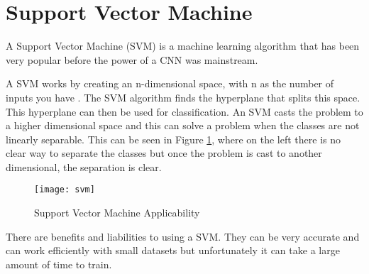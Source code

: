 \section{Support Vector Machine}
A Support Vector Machine (SVM) is a machine learning algorithm that has been
very popular before the power of a CNN was mainstream.

A SVM works by creating an n-dimensional space, with n as the number of
inputs you have \textcite{svm}. The SVM algorithm finds the hyperplane that splits this space.
This hyperplane can then be used for classification. 
An SVM casts the problem to a higher dimensional space and this can solve a problem when the classes are not linearly separable.
This can be seen in Figure \ref{fig:svm}, where on the left there is no clear way to separate the classes but once the problem is cast to another dimensional, the separation is clear.

\begin{figure}
    \texttt{[image: svm]}
    \caption{Support Vector Machine Applicability}
    \label{fig:svm}
\end{figure}

There are benefits and liabilities to using a SVM.
They can be very accurate and can work efficiently with small datasets but unfortunately it can take a large amount of time to train. 